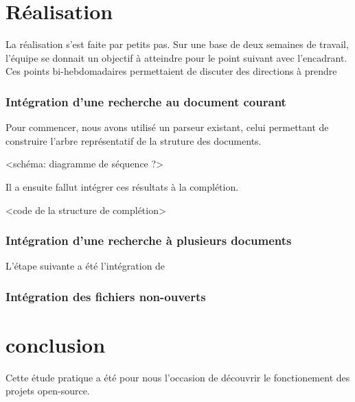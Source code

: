 \documentclass[a4paper,11pt]{report}
\begin{document}

\chapter{Réalisation}
La réalisation s'est faite par petits pas. Sur une base de deux semaines de travail, l'équipe se donnait un objectif à atteindre pour le point suivant avec l'encadrant.
Ces points bi-hebdomadaires permettaient de discuter des directions à prendre 

\subsection{Intégration d'une recherche au document courant}
Pour commencer, nous avons utilisé un parseur existant, celui permettant de construire l'arbre représentatif de la struture des documents.

<schéma: diagramme de séquence ?>

Il a ensuite fallut intégrer ces résultats à la complétion.

<code de la structure de complétion> 

\subsection{Intégration d'une recherche à plusieurs documents}

L'étape suivante a été l'intégration de 

\subsection{Intégration des fichiers non-ouverts}

\chapter{conclusion}
Cette étude pratique a été pour nous l'occasion de découvrir le fonctionement des projets open-source.
\end{document}

